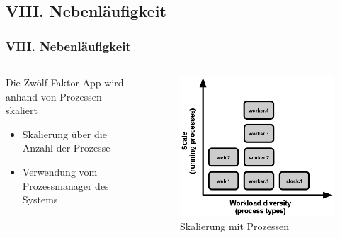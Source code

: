 \documentclass{beamer}
\begin{document}
			\subsection{VIII. Nebenläufigkeit}
				\begin{frame}
					\frametitle{VIII. Nebenläufigkeit}
					\begin{columns}
							\begin{block}{Die Zwölf-Faktor-App wird anhand von Prozessen skaliert}
						\begin{itemize}
							\item Skalierung über die Anzahl der Prozesse
							\item Verwendung vom Prozessmanager des Systems
						\end{itemize}
					\end{block}
					\begin{figure}[htpb]
						\centering
						\includegraphics[width=\textwidth]{process-types.png}
						\caption{Skalierung mit Prozessen \cite{factor-concurrency}}
					\end{figure}
					\end{columns}
				\end{frame}
\end{document}
